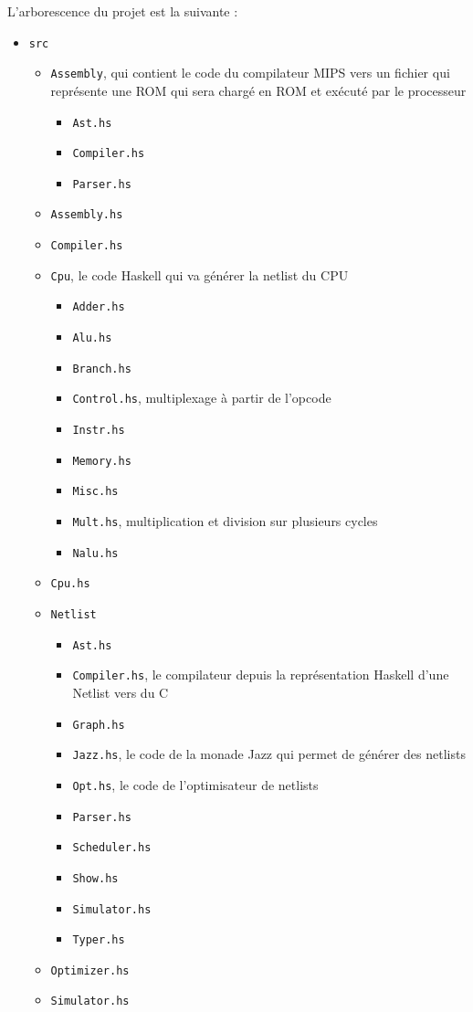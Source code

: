 L'arborescence du projet est la suivante :
\begin{itemize}
\item \texttt{src}
  \begin{itemize}
  \item \texttt{Assembly}, qui contient le code du compilateur MIPS vers un fichier qui représente une ROM qui sera chargé en ROM et exécuté par le processeur
    \begin{itemize}
    \item \texttt{Ast.hs}
    \item \texttt{Compiler.hs}
    \item \texttt{Parser.hs}
    \end{itemize}

  \item \texttt{Assembly.hs}
  \item \texttt{Compiler.hs}
  \item \texttt{Cpu}, le code Haskell qui va générer la netlist du CPU
    \begin{itemize}
    \item \texttt{Adder.hs}
    \item \texttt{Alu.hs}
    \item \texttt{Branch.hs}
    \item \texttt{Control.hs}, multiplexage à partir de l'opcode
    \item \texttt{Instr.hs}
    \item \texttt{Memory.hs}
    \item \texttt{Misc.hs}
    \item \texttt{Mult.hs}, multiplication et division sur plusieurs cycles
    \item \texttt{Nalu.hs}
    \end{itemize}
  \item \texttt{Cpu.hs}
  \item \texttt{Netlist}
    \begin{itemize}
    \item \texttt{Ast.hs}
    \item \texttt{Compiler.hs}, le compilateur depuis la représentation Haskell d'une Netlist vers du C
    \item \texttt{Graph.hs}
    \item \texttt{Jazz.hs}, le code de la monade Jazz qui permet de générer des netlists
    \item \texttt{Opt.hs}, le code de l'optimisateur de netlists
    \item \texttt{Parser.hs}
    \item \texttt{Scheduler.hs}
    \item \texttt{Show.hs}
    \item \texttt{Simulator.hs}
    \item \texttt{Typer.hs}
    \end{itemize}
  \item \texttt{Optimizer.hs}
  \item \texttt{Simulator.hs}
  \end{itemize}
\end{itemize}

